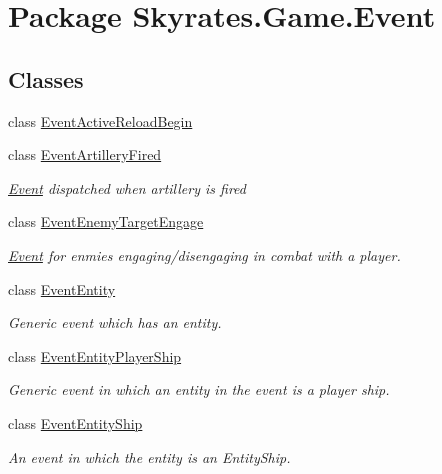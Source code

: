 \hypertarget{namespace_skyrates_1_1_game_1_1_event}{\section{Package Skyrates.\-Game.\-Event}
\label{namespace_skyrates_1_1_game_1_1_event}
}
\subsection*{Classes}
\begin{DoxyCompactItemize}
\item 
class \hyperlink{class_skyrates_1_1_game_1_1_event_1_1_event_active_reload_begin}{Event\-Active\-Reload\-Begin}
\item 
class \hyperlink{class_skyrates_1_1_game_1_1_event_1_1_event_artillery_fired}{Event\-Artillery\-Fired}
\begin{DoxyCompactList}\small\item\em \hyperlink{namespace_skyrates_1_1_game_1_1_event}{Event} dispatched when artillery is fired \end{DoxyCompactList}\item 
class \hyperlink{class_skyrates_1_1_game_1_1_event_1_1_event_enemy_target_engage}{Event\-Enemy\-Target\-Engage}
\begin{DoxyCompactList}\small\item\em \hyperlink{namespace_skyrates_1_1_game_1_1_event}{Event} for enmies engaging/disengaging in combat with a player. \end{DoxyCompactList}\item 
class \hyperlink{class_skyrates_1_1_game_1_1_event_1_1_event_entity}{Event\-Entity}
\begin{DoxyCompactList}\small\item\em Generic event which has an entity. \end{DoxyCompactList}\item 
class \hyperlink{class_skyrates_1_1_game_1_1_event_1_1_event_entity_player_ship}{Event\-Entity\-Player\-Ship}
\begin{DoxyCompactList}\small\item\em Generic event in which an entity in the event is a player ship. \end{DoxyCompactList}\item 
class \hyperlink{class_skyrates_1_1_game_1_1_event_1_1_event_entity_ship}{Event\-Entity\-Ship}
\begin{DoxyCompactList}\small\item\em An event in which the entity is an Entity\-Ship. \end{DoxyCompactList}\item 

\end{DoxyCompactItemize}
